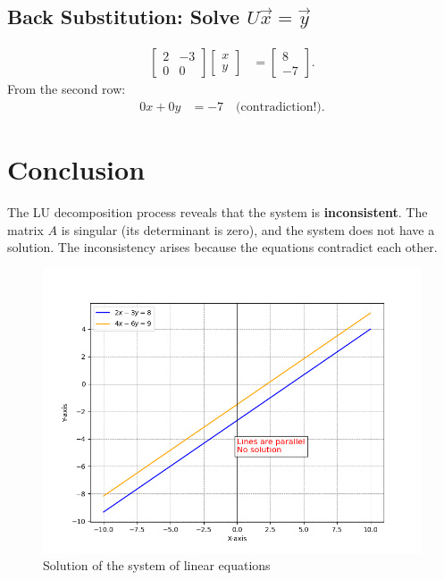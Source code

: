 \documentclass[journal]{IEEEtran}
\begin{document}
\subsection*{Back Substitution: Solve \(U \vec{x} = \vec{y}\)}
\begin{align}
    \begin{bmatrix} 2 & -3 \\ 0 & 0 \end{bmatrix}
    \begin{bmatrix} x \\ y \end{bmatrix} &=
    \begin{bmatrix} 8 \\ -7 \end{bmatrix}.
\end{align}
From the second row:
\begin{align}
    0x + 0y &= -7 \quad \text{(contradiction!)}.
\end{align}

\section*{Conclusion}
The LU decomposition process reveals that the system is \textbf{inconsistent}. The matrix \(A\) is singular (its determinant is zero), and the system does not have a solution. The inconsistency arises because the equations contradict each other.
\begin{figure}[!ht]
		\centering
		\includegraphics[width=\columnwidth]{figs/Figure_1.png}
		\caption{Solution of the system of linear equations}
		\label{stemplot}
	\end{figure}
\end{document}
